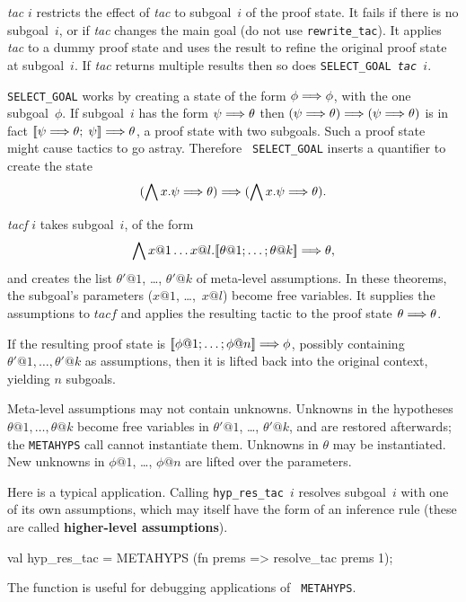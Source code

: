 \begin{ttdescription}
\item[\ttindexbold{SELECT_GOAL} {\it tac} $i$] 
restricts the effect of {\it tac\/} to subgoal~$i$ of the proof state.  It
fails if there is no subgoal~$i$, or if {\it tac\/} changes the main goal
(do not use {\tt rewrite_tac}).  It applies {\it tac\/} to a dummy proof
state and uses the result to refine the original proof state at
subgoal~$i$.  If {\it tac\/} returns multiple results then so does 
\hbox{\tt SELECT_GOAL {\it tac} $i$}.

{\tt SELECT_GOAL} works by creating a state of the form $\phi\Longrightarrow\phi$,
with the one subgoal~$\phi$.  If subgoal~$i$ has the form $\psi\Longrightarrow\theta$
then $(\psi\Longrightarrow\theta)\Longrightarrow(\psi\Longrightarrow\theta)$ is in fact
$\mathopen{[\![}\psi\Longrightarrow\theta;\; \psi\mathclose{]\!]}\Longrightarrow\theta$, a proof state with two subgoals.
Such a proof state might cause tactics to go astray.  Therefore {\tt
  SELECT_GOAL} inserts a quantifier to create the state
\[ (\bigwedge x.\psi\Longrightarrow\theta)\Longrightarrow(\bigwedge x.\psi\Longrightarrow\theta). \]

\item[\ttindexbold{METAHYPS} {\it tacf} $i$]
takes subgoal~$i$, of the form 
\[ \Forall x@1 \ldots x@l. \List{\theta@1; \ldots; \theta@k}\Imp\theta, \]
and creates the list $\theta'@1$, \ldots, $\theta'@k$ of meta-level
assumptions.  In these theorems, the subgoal's parameters ($x@1$,
\ldots,~$x@l$) become free variables.  It supplies the assumptions to
$tacf$ and applies the resulting tactic to the proof state
$\theta\Longrightarrow\theta$.

If the resulting proof state is $\List{\phi@1; \ldots; \phi@n} \Imp \phi$,
possibly containing $\theta'@1,\ldots,\theta'@k$ as assumptions, then it is
lifted back into the original context, yielding $n$ subgoals.

Meta-level assumptions may not contain unknowns.  Unknowns in the
hypotheses $\theta@1,\ldots,\theta@k$ become free variables in $\theta'@1$,
\ldots, $\theta'@k$, and are restored afterwards; the {\tt METAHYPS} call
cannot instantiate them.  Unknowns in $\theta$ may be instantiated.  New
unknowns in $\phi@1$, \ldots, $\phi@n$ are lifted over the parameters.

Here is a typical application.  Calling {\tt hyp_res_tac}~$i$ resolves
subgoal~$i$ with one of its own assumptions, which may itself have the form
of an inference rule (these are called {\bf higher-level assumptions}).  
\begin{ttbox} 
val hyp_res_tac = METAHYPS (fn prems => resolve_tac prems 1);
\end{ttbox} 
The function  is useful for debugging applications of {\tt
  METAHYPS}. 
\end{ttdescription}

